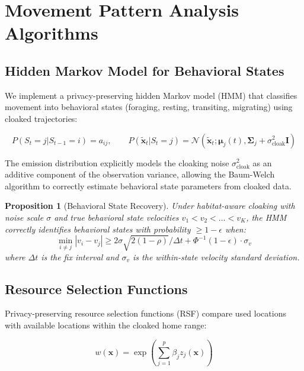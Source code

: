 \documentclass[11pt,letterpaper]{article}
\newtheorem{proposition}[theorem]{Proposition}
\begin{document}
\section{Movement Pattern Analysis Algorithms}

\subsection{Hidden Markov Model for Behavioral States}

We implement a privacy-preserving hidden Markov model (HMM) that classifies movement into behavioral states (foraging, resting, transiting, migrating) using cloaked trajectories:

\begin{equation}
P(S_t = j | S_{t-1} = i) = a_{ij}, \qquad P(\tilde{\mathbf{x}}_t | S_t = j) = \mathcal{N}(\tilde{\mathbf{x}}_t; \boldsymbol{\mu}_j(t), \boldsymbol{\Sigma}_j + \sigma_{\text{cloak}}^2 \mathbf{I})
\end{equation}

The emission distribution explicitly models the cloaking noise $\sigma_{\text{cloak}}^2$ as an additive component of the observation variance, allowing the Baum-Welch algorithm to correctly estimate behavioral state parameters from cloaked data.

\begin{proposition}[Behavioral State Recovery]
Under habitat-aware cloaking with noise scale $\sigma$ and true behavioral state velocities $v_1 < v_2 < \ldots < v_K$, the HMM correctly identifies behavioral states with probability $\geq 1 - \epsilon$ when:
\begin{equation}
\min_{i \neq j} |v_i - v_j| \geq 2\sigma\sqrt{2(1-\rho)} / \Delta t + \Phi^{-1}(1-\epsilon) \cdot \sigma_v
\end{equation}
where $\Delta t$ is the fix interval and $\sigma_v$ is the within-state velocity standard deviation.
\end{proposition}

\subsection{Resource Selection Functions}

Privacy-preserving resource selection functions (RSF) compare used locations with available locations within the cloaked home range:

\begin{equation}
w(\mathbf{x}) = \exp\left(\sum_{j=1}^{p} \beta_j z_j(\mathbf{x})\right)
\end{equation}
\end{document}
